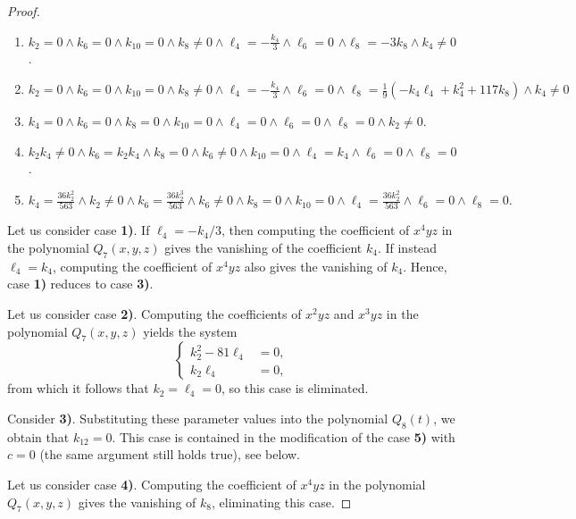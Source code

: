 \documentclass[14pt, dvipsnames]{extarticle}
\theoremstyle{definition}
\theoremstyle{definition}
\theoremstyle{remark}
\begin{document}
\begin{proof}
\begin{enumerate}[\bf 1)]
\item $k_2=0\land k_6=0\land k_{10}=0\land k_8\neq 0\land \ell_4=-\frac{k_4}{3}\land \ell_6=0$ $\land \ell_8=-3k_8\land k_4\neq 0$.

\item $k_2=0\land k_6=0\land k_{10}=0\land k_8\neq 0\land \ell_4=-\frac{k_4}{3}\land \ell_6=0\land \ell_8=\frac{1}{9} \left(-k_4 \ell_4+k_4^2+117 k_8\right)\land k_4\neq 0$

\item $k_4=0\land k_6=0\land k_8=0\land k_{10}=0\land \ell_4=0\land \ell_6=0\land \ell_8=0\land k_2\neq 0$. 

\item $k_2 k_4\neq 0\land k_6=k_2 k_4\land k_8=0\land k_6\neq 0\land k_{10}=0\land \ell_4 = k_4\land \ell_6=0\land \ell_8=0$. 

\item $k_4=\frac{36 k_2^2}{563}\land k_2\neq 0\land k_6=\frac{36 k_2^3}{563}\land k_6\neq 0\land k_8=0\land k_{10}=0\land \ell_4=\frac{36 k_2^2}{563}\land \ell_6=0\land \ell_8=0.$

\end{enumerate}

Let us consider case {\bf 1)}. If $\ell_4 = -k_4/3$, then computing the coefficient of $x^4yz$ in the polynomial $Q_7(x, y, z)$ gives the vanishing of the coefficient $k_4$. If instead $\ell_4 = k_4$, computing the coefficient of $x^4yz$ also gives the vanishing of $k_4$. Hence, case {\bf 1)} reduces to case {\bf 3)}.

Let us consider case {\bf 2)}. Computing the coefficients of $x^2yz$ and $x^3yz$ in the polynomial $Q_7(x, y, z)$ yields the system
$$\begin{cases}
k_{2}^{2}-81\ell_{4} & =0,\\
k_{2}\ell_{4} & =0,
\end{cases}$$
from which it follows that $k_2 = \ell_4 = 0$, so this case is eliminated.

Consider {\bf 3)}. Substituting these parameter values into the polynomial $Q_8(t)$, we obtain that $k_{12} = 0$. This case is contained in the modification of the case {\bf 5)} with $c = 0$ (the same argument still holds true), see below.

Let us consider case {\bf 4)}. Computing the coefficient of $x^4yz$ in the polynomial $Q_7(x, y, z)$ gives the vanishing of $k_8$, eliminating this case.


\end{proof}
\end{document}
